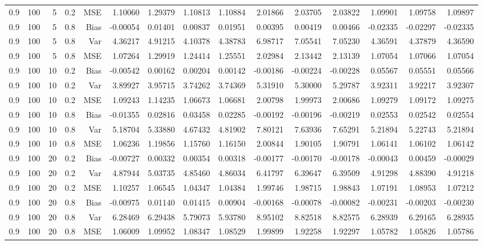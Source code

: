 \begin{table}[!htbp]
\begin{tabular}{lrrrrrrrrrrrrrr}
0.9 & 100 &  5 & 0.2 & MSE & 1.10060 & 1.29379 & 1.10813 & 1.10884 & 2.01866 & 2.03705 & 2.03822 & 1.09901 & 1.09758 & 1.09897 \\
0.9 & 100 &  5 & 0.8 & Bias & -0.00054 & 0.01401 & 0.00837 & 0.01951 & 0.00395 & 0.00419 & 0.00466 & -0.02335 & -0.02297 & -0.02335 \\
0.9 & 100 &  5 & 0.8 & Var & 4.36217 & 4.91215 & 4.10378 & 4.38783 & 6.98717 & 7.05541 & 7.05230 & 4.36591 & 4.37879 & 4.36590 \\
0.9 & 100 &  5 & 0.8 & MSE & 1.07264 & 1.29919 & 1.24414 & 1.25551 & 2.02984 & 2.13442 & 2.13139 & 1.07054 & 1.07066 & 1.07054 \\
0.9 & 100 & 10 & 0.2 & Bias & -0.00542 & 0.00162 & 0.00204 & 0.00142 & -0.00186 & -0.00224 & -0.00228 & 0.05567 & 0.05551 & 0.05566 \\
0.9 & 100 & 10 & 0.2 & Var & 3.89927 & 3.95715 & 3.74262 & 3.74369 & 5.31910 & 5.30000 & 5.29787 & 3.92311 & 3.92217 & 3.92307 \\
0.9 & 100 & 10 & 0.2 & MSE & 1.09243 & 1.14235 & 1.06673 & 1.06681 & 2.00798 & 1.99973 & 2.00686 & 1.09279 & 1.09172 & 1.09275 \\
0.9 & 100 & 10 & 0.8 & Bias & -0.01355 & 0.02816 & 0.03458 & 0.02285 & -0.00192 & -0.00196 & -0.00219 & 0.02553 & 0.02542 & 0.02554 \\
0.9 & 100 & 10 & 0.8 & Var & 5.18704 & 5.33880 & 4.67432 & 4.81902 & 7.80121 & 7.63936 & 7.65291 & 5.21894 & 5.22743 & 5.21894 \\
0.9 & 100 & 10 & 0.8 & MSE & 1.06236 & 1.19856 & 1.15760 & 1.16150 & 2.00844 & 1.90105 & 1.90791 & 1.06141 & 1.06102 & 1.06142 \\
0.9 & 100 & 20 & 0.2 & Bias & -0.00727 & 0.00332 & 0.00354 & 0.00318 & -0.00177 & -0.00170 & -0.00178 & -0.00043 & 0.00459 & -0.00029 \\
0.9 & 100 & 20 & 0.2 & Var & 4.87944 & 5.03735 & 4.85460 & 4.86034 & 6.41797 & 6.39647 & 6.39509 & 4.91298 & 4.88390 & 4.91218 \\
0.9 & 100 & 20 & 0.2 & MSE & 1.10257 & 1.06545 & 1.04347 & 1.04384 & 1.99746 & 1.98715 & 1.98843 & 1.07191 & 1.08953 & 1.07212 \\
0.9 & 100 & 20 & 0.8 & Bias & -0.00975 & 0.01140 & 0.01415 & 0.00904 & -0.00168 & -0.00078 & -0.00082 & -0.00231 & -0.00203 & -0.00230 \\
0.9 & 100 & 20 & 0.8 & Var & 6.28469 & 6.29438 & 5.79073 & 5.93780 & 8.95102 & 8.82518 & 8.82575 & 6.28939 & 6.29165 & 6.28935 \\
0.9 & 100 & 20 & 0.8 & MSE & 1.06009 & 1.09952 & 1.08347 & 1.08529 & 1.99899 & 1.92258 & 1.92297 & 1.05782 & 1.05826 & 1.05786 \\

\end{tabular}
\end{table}
